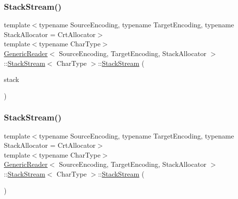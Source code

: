 \subsubsection{\texorpdfstring{Stack\+Stream()}{StackStream()}\hspace{0.1cm}{\footnotesize\ttfamily [1/2]}}
{\footnotesize\ttfamily template$<$typename Source\+Encoding, typename Target\+Encoding, typename Stack\+Allocator = Crt\+Allocator$>$ \\
template$<$typename Char\+Type$>$ \\
\hyperlink{classGenericReader}{Generic\+Reader}$<$ Source\+Encoding, Target\+Encoding, Stack\+Allocator $>$\+::\hyperlink{classGenericReader_1_1StackStream}{Stack\+Stream}$<$ Char\+Type $>$\+::\hyperlink{classGenericReader_1_1StackStream}{Stack\+Stream} (\begin{DoxyParamCaption}\item[{\hyperlink{classinternal_1_1Stack}{internal\+::\+Stack}$<$ Stack\+Allocator $>$ \&}]{stack }\end{DoxyParamCaption})\hspace{0.3cm}{\ttfamily [inline]}}

\mbox{\label{classGenericReader_1_1StackStream_a66f42e9a55810bf5bfe1b5c86c09dd51}} 
\subsubsection{\texorpdfstring{Stack\+Stream()}{StackStream()}\hspace{0.1cm}{\footnotesize\ttfamily [2/2]}}
{\footnotesize\ttfamily template$<$typename Source\+Encoding, typename Target\+Encoding, typename Stack\+Allocator = Crt\+Allocator$>$ \\
template$<$typename Char\+Type$>$ \\
\hyperlink{classGenericReader}{Generic\+Reader}$<$ Source\+Encoding, Target\+Encoding, Stack\+Allocator $>$\+::\hyperlink{classGenericReader_1_1StackStream}{Stack\+Stream}$<$ Char\+Type $>$\+::\hyperlink{classGenericReader_1_1StackStream}{Stack\+Stream} (\begin{DoxyParamCaption}\item[{const \hyperlink{classGenericReader_1_1StackStream}{Stack\+Stream}$<$ Char\+Type $>$ \&}]{ }\end{DoxyParamCaption})\hspace{0.3cm}{\ttfamily [private]}}



